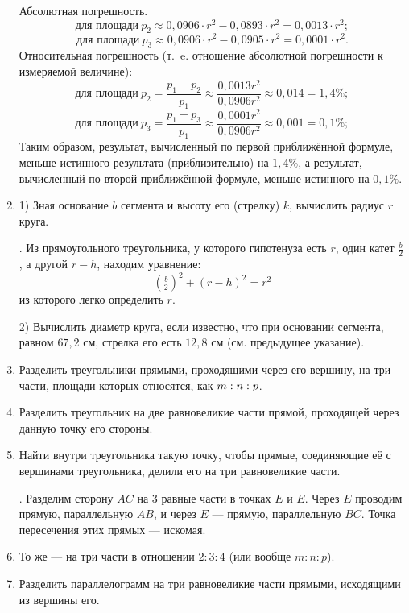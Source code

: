 \documentclass[oneside]{book}
\begin{document}
\begin{enumerate}[resume]
Абсолютная погрешность.
\[\text{для площади}~p_2 \approx 0{,}0906\cdot r^2 - 0{,}0893\cdot r^2 = 0{,}0013\cdot r^2;\]
\[\text{для площади}~p_3 \approx 0{,}0906\cdot r^2 - 0{,}0905\cdot r^2 = 0{,}0001\cdot r^2.\]
Относительная погрешность (т.~e. отношение абсолютной погрешности к измеряемой величине):
\[\text{для площади}~p_2 = \frac{p_1-p_2}{p_1}\approx\frac{0{,}0013r^2}{0{,}0906r^2}\approx0{,}014 = 1{,}4\%;\]
\[\text{для площади}~p_3 = \frac{p_1-p_3}{p_1}\approx\frac{0{,}0001r^2}{0{,}0906r^2}\approx0{,}001 = 0{,}1\%;\]
Таким образом, результат, вычисленный по первой приближённой формуле, меньше истинного результата (приблизительно) на $1{,}4\%$, а результат, вычисленный по второй приближённой формуле, меньше истинного на $0{,}1\%$.

 \item
1) Зная основание $b$ сегмента и высоту его (стрелку) $k$, вычислить радиус $r$ круга.

.
Из прямоугольного треугольника, у которого гипотенуза есть $r$, один катет $\frac b2$, а другой $r-h$, находим уравнение:
\[(\tfrac b2)^2+(r-h)^2=r^2\]
из которого легко определить $r$.

2) Вычислить диаметр круга, если известно, что при основании сегмента, равном $67{,}2$ см, стрелка его есть $12{,}8$ см (см. предыдущее указание).


 \item
Разделить треугольники прямыми, проходящими через его вершину, на три части, площади которых относятся, как $m\z:n:p$.

 \item
Разделить треугольник на две равновеликие части прямой, проходящей через данную точку его стороны.

 \item
Найти внутри треугольника такую точку, чтобы прямые, соединяющие её с вершинами треугольника, делили его на три равновеликие части.

.
Разделим сторону $AC$ на $3$ равные части в точках $E$ и $E$.
Через $E$ проводим прямую, параллельную $AB$, и через $E$ — прямую, параллельную $BC$.
Точка пересечения этих прямых — искомая.

 \item
То же — на три части в отношении $2:3:4$ (или вообще $m:n:p$).

 \item
Разделить параллелограмм на три равновеликие части прямыми, исходящими из вершины его.


\end{enumerate}
\end{document}
